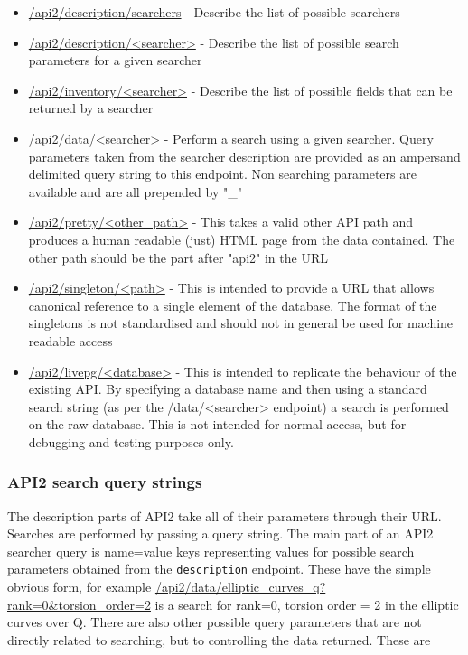 \documentclass[11pt]{article}
\begin{document}
\begin{itemize}
\item \url{/api2/description/searchers} - Describe the list of possible searchers
\item \url{/api2/description/<searcher>} - Describe the list of possible search parameters for a given searcher
\item \url{/api2/inventory/<searcher>} - Describe the list of possible fields that can be returned by a searcher
\item \url{/api2/data/<searcher>} - Perform a search using a given searcher. Query parameters taken from the searcher description are provided as an ampersand delimited query string to this endpoint. Non searching parameters are available and are all prepended by "\_"
\item \url{/api2/pretty/<other_path>} - This takes a valid other API path and produces a human readable (just) HTML page from the data contained. The other path should be the part after "api2" in the URL
\item \url{/api2/singleton/<path>} - This is intended to provide a URL that allows canonical reference to a single element of the database. The format of the singletons is not standardised and should not in general be used for machine readable access
\item \url{/api2/livepg/<database>} - This is intended to replicate the behaviour of the existing API. By specifying a database name and then using a standard search string (as per the /data/<searcher> endpoint) a search is performed on the raw database. This is not intended for normal access, but for debugging and testing purposes only.
\end{itemize}

\subsubsection{API2 search query strings}
The description parts of API2 take all of their parameters through their URL. Searches are performed by passing a query string. The main part of an API2 searcher query is name=value keys representing values for possible search parameters obtained from the \texttt{description} endpoint. These have the simple obvious form, for example \url{/api2/data/elliptic_curves_q?rank=0&torsion_order=2} is a search for rank=0, torsion order = 2 in the elliptic curves over Q. There are also other possible query parameters that are not directly related to searching, but to controlling the data returned. These are
\end{document}
